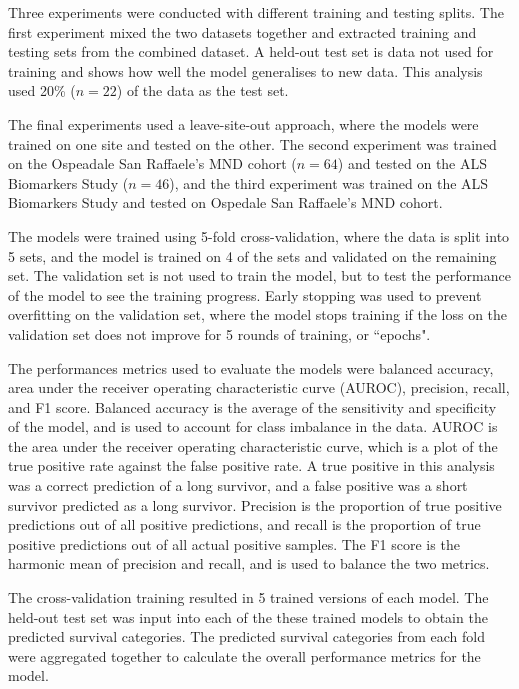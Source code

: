 Three experiments were conducted with different training and testing splits.
The first experiment mixed the two datasets together and extracted training and testing sets from the combined dataset.
A held-out test set is data not used for training and shows how well the model generalises to new data.
This analysis used 20\% ($n=22$) of the data as the test set.

The final experiments used a leave-site-out approach, where the models were trained on one site and tested on the other.
The second experiment was trained on the Ospeadale San Raffaele's MND cohort ($n=64$) and tested on the ALS Biomarkers Study ($n=46$), and the third experiment was trained on the ALS Biomarkers Study and tested on Ospedale San Raffaele's MND cohort.

The models were trained using 5-fold cross-validation, where the data is split into 5 sets, and the model is trained on 4 of the sets and validated on the remaining set.
The validation set is not used to train the model, but to test the performance of the model to see the training progress.
Early stopping was used to prevent overfitting on the validation set, where the model stops training if the loss on the validation set does not improve for 5 rounds of training, or ``epochs".

The performances metrics used to evaluate the models were balanced accuracy, area under the receiver operating characteristic curve (AUROC), precision, recall, and F1 score.
Balanced accuracy is the average of the sensitivity and specificity of the model, and is used to account for class imbalance in the data.
AUROC is the area under the receiver operating characteristic curve, which is a plot of the true positive rate against the false positive rate.
A true positive in this analysis was a correct prediction of a long survivor, and a false positive was a short survivor predicted as a long survivor.
Precision is the proportion of true positive predictions out of all positive predictions, and recall is the proportion of true positive predictions out of all actual positive samples.
The F1 score is the harmonic mean of precision and recall, and is used to balance the two metrics.

The cross-validation training resulted in 5 trained versions of each model.
The held-out test set was input into each of the these trained models to obtain the predicted survival categories.
The predicted survival categories from each fold were aggregated together to calculate the overall performance metrics for the model.


